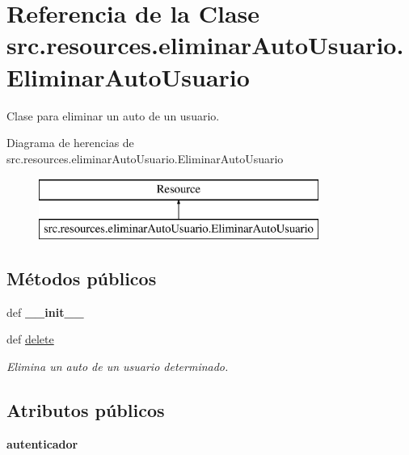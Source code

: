 \hypertarget{classsrc_1_1resources_1_1eliminar_auto_usuario_1_1_eliminar_auto_usuario}{\section{Referencia de la Clase src.\-resources.\-eliminar\-Auto\-Usuario.\-Eliminar\-Auto\-Usuario}
\label{classsrc_1_1resources_1_1eliminar_auto_usuario_1_1_eliminar_auto_usuario}
}


Clase para eliminar un auto de un usuario.  


Diagrama de herencias de src.\-resources.\-eliminar\-Auto\-Usuario.\-Eliminar\-Auto\-Usuario\begin{figure}[H]
\begin{center}
\leavevmode
\includegraphics[height=2.000000cm]{classsrc_1_1resources_1_1eliminar_auto_usuario_1_1_eliminar_auto_usuario}
\end{center}
\end{figure}
\subsection*{Métodos públicos}
\begin{DoxyCompactItemize}
\item 
\hypertarget{classsrc_1_1resources_1_1eliminar_auto_usuario_1_1_eliminar_auto_usuario_aabebf5d292e7ee2ed564aada86f1dc95}{def {\bfseries \-\_\-\-\_\-init\-\_\-\-\_\-}}\label{classsrc_1_1resources_1_1eliminar_auto_usuario_1_1_eliminar_auto_usuario_aabebf5d292e7ee2ed564aada86f1dc95}

\item 
def \hyperlink{classsrc_1_1resources_1_1eliminar_auto_usuario_1_1_eliminar_auto_usuario_aac1268a9c74bab80d45a5a38fe618373}{delete}
\begin{DoxyCompactList}\small\item\em Elimina un auto de un usuario determinado. \end{DoxyCompactList}\end{DoxyCompactItemize}
\subsection*{Atributos públicos}
\begin{DoxyCompactItemize}
\item 
\hypertarget{classsrc_1_1resources_1_1eliminar_auto_usuario_1_1_eliminar_auto_usuario_ab77bd6a65a9a217084342983fed700d3}{{\bfseries autenticador}}\label{classsrc_1_1resources_1_1eliminar_auto_usuario_1_1_eliminar_auto_usuario_ab77bd6a65a9a217084342983fed700d3}

\end{DoxyCompactItemize}
